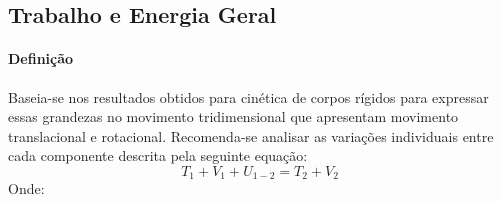 \documentclass{article}
\begin{document}
        \subsection{Trabalho e Energia Geral}
            \paragraph{Definição}Baseia-se nos resultados obtidos para cinética de corpos rígidos para expressar essas grandezas no movimento tridimensional que apresentam movimento translacional e rotacional. Recomenda-se analisar as variações individuais entre cada componente descrita pela seguinte equação:
                \begin{equation}
                    \boxed{
                        T_{1} + V_{1} + U_{1-2} = T_{2} + V_{2}
                    }
                \end{equation}
            Onde:
\end{document}
